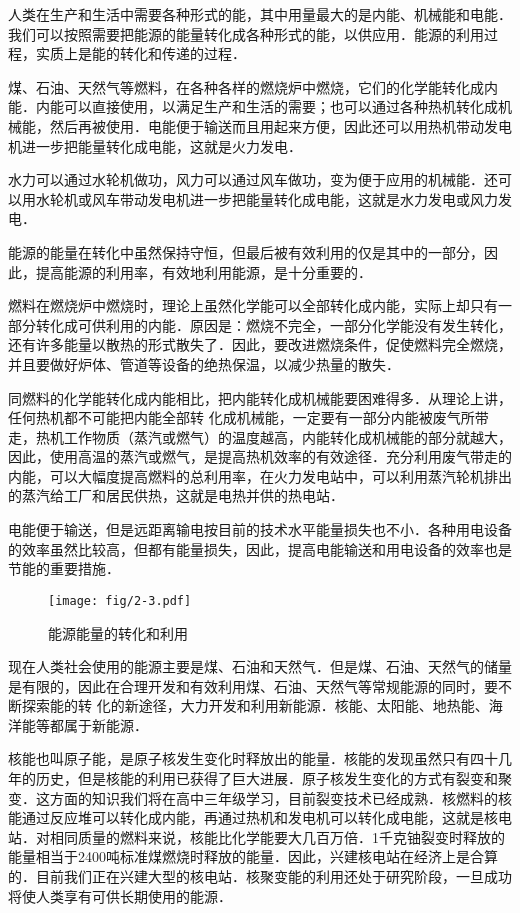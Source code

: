 人类在生产和生活中需要各种形式的能，其中用量最大的是内能、机械能和电能．我们可以按照需要把能源的能量转化成各种形式的能，以供应用．能源的利用过程，实质上是能的转化和传递的过程．

煤、石油、天然气等燃料，在各种各样的燃烧炉中燃烧，它们的化学能转化成内能．内能可以直接使用，以满足生产和生活的需要；也可以通过各种热机转化成机械能，然后再被使用．电能便于输送而且用起来方便，因此还可以用热机带动发电机进一步把能量转化成电能，这就是火力发电．

水力可以通过水轮机做功，风力可以通过风车做功，变为便于应用的机械能．还可以用水轮机或风车带动发电机进一步把能量转化成电能，这就是水力发电或风力发电．

能源的能量在转化中虽然保持守恒，但最后被有效利用的仅是其中的一部分，因此，提高能源的利用率，有效地利用能源，是十分重要的．

燃料在燃烧炉中燃烧时，理论上虽然化学能可以全部转化成内能，实际上却只有一部分转化成可供利用的内能．原因是：燃烧不完全，一部分化学能没有发生转化，还有许多能量以散热的形式散失了．因此，要改进燃烧条件，促使燃料完全燃烧，并且要做好炉体、管道等设备的绝热保温，以减少热量的散失．

同燃料的化学能转化成内能相比，把内能转化成机械能要困难得多．从理论上讲，任何热机都不可能把内能全部转
化成机械能，一定要有一部分内能被废气所带走，热机工作物质（蒸汽或燃气）的温度越高，内能转化成机械能的部分就越大，因此，使用高温的蒸汽或燃气，是提高热机效率的有效途径．充分利用废气带走的内能，可以大幅度提高燃料的总利用率，在火力发电站中，可以利用蒸汽轮机排出的蒸汽给工厂和居民供热，这就是电热并供的热电站．

电能便于输送，但是远距离输电按目前的技术水平能量损失也不小．各种用电设备的效率虽然比较高，但都有能量损失，因此，提高电能输送和用电设备的效率也是节能的重要措施．

\begin{figure}[htp]
\centering\texttt{[image: fig/2-3.pdf]}
\caption{能源能量的转化和利用}
\end{figure}

现在人类社会使用的能源主要是煤、石油和天然气．但是煤、石油、天然气的储量是有限的，因此在合理开发和有效利用煤、石油、天然气等常规能源的同时，要不断探索能的转
化的新途径，大力开发和利用新能源．核能、太阳能、地热能、海洋能等都属于新能源．

核能也叫原子能，是原子核发生变化时释放出的能量．核能的发现虽然只有四十几年的历史，但是核能的利用已获得了巨大进展．原子核发生变化的方式有裂变和聚变．这方面的知识我们将在高中三年级学习，目前裂变技术已经成熟．核燃料的核能通过反应堆可以转化成内能，再通过热机和发电机可以转化成电能，这就是核电站．对相同质量的燃料来说，核能比化学能要大几百万倍．1千克铀裂变时释放的能量相当于2400吨标准煤燃烧时释放的能量．因此，兴建核电站在经济上是合算的．目前我们正在兴建大型的核电站．核聚变能的利用还处于研究阶段，一旦成功将使人类享有可供长期使用的能源．

